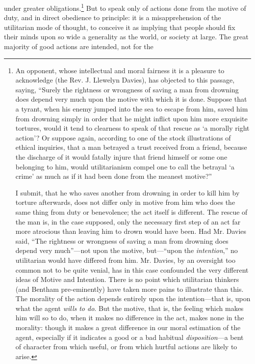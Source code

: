 under greater obligations.\footnote{An opponent, whose intellectual
and moral fairness it is a pleasure to acknowledge (the Rev. J.
Llewelyn Davies), has objected to this passage, saying, ``Surely the
rightness or wrongness of saving a man from drowning does depend very
much upon the motive with which it is done. Suppose that a tyrant,
when his enemy jumped into the sea to escape from him, saved him from
drowning simply in order that he might inflict upon him more exquisite
tortures, would it tend to clearness to speak of that rescue as `a
morally right action'? Or suppose again, according to one of the stock
illustrations of ethical inquiries, that a man betrayed a trust
received from a friend, because the discharge of it would fatally
injure that friend himself or some one belonging to him, would
utilitarianism compel one to call the betrayal `a crime' as much as if
it had been done from the meanest motive?''

I submit, that he who saves another from drowning in order to kill him
by torture afterwards, does not differ only in motive from him who
does the same thing from duty or benevolence; the act itself is
different. The rescue of the man is, in the case supposed, only the
necessary first step of an act far more atrocious than leaving him to
drown would have been. Had Mr. Davies said, ``The rightness or
wrongness of saving a man from drowning does depend very much''---not
upon the motive, but---``upon the \textit{intention},'' no utilitarian
would have differed from him. Mr. Davies, by an oversight too common
not to be quite venial, has in this case confounded the very different
ideas of Motive and Intention. There is no point which utilitarian
thinkers (and Bentham pre-eminently) have taken more pains to
illustrate than this. The morality of the action depends entirely upon
the intention---that is, upon what the agent \textit{wills to do}. But
the motive, that is, the feeling which makes him will so to do, when
it makes no difference in the act, makes none in the morality: though
it makes a great difference in our moral estimation of the agent,
especially if it indicates a good or a bad habitual
\textit{dis\-po\-si\-tion}---a bent of character from which useful, or
from which hurtful actions are likely to arise.} But to speak only of
actions  done from the motive of duty, and in direct
obedience to principle: it is a misapprehension of the utilitarian
mode of thought, to conceive it as implying that people should fix
their minds upon so wide a generality as the world, or society at
large. The great majority of good actions are intended, not for the
